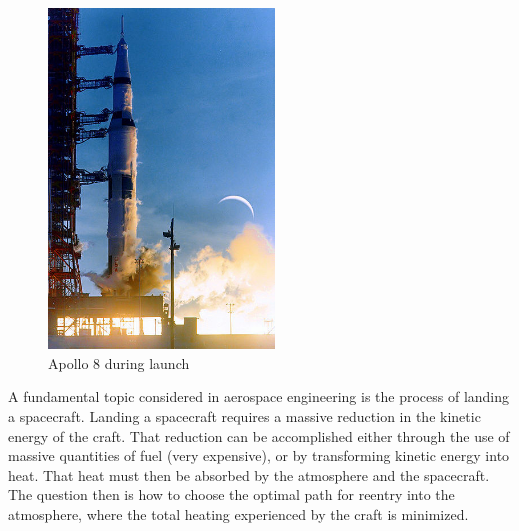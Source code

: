 \label{lab:reentry}

\begin{figure}
\centering
\includegraphics[width=6cm]{Apollo8_during_Launch.jpg}
\caption{Apollo 8 during launch}
\label{fig:reentry:apollo8}
\end{figure}

A fundamental topic considered in aerospace engineering is the process of landing a spacecraft. 
Landing a spacecraft requires a massive reduction in the kinetic energy of the craft. 
That reduction can be accomplished either through the use of massive quantities of fuel (very expensive), or by  transforming kinetic energy into heat. 
That heat must then be absorbed by the atmosphere and the spacecraft. 
The question then is how to choose the optimal path for reentry into the atmosphere, where the total heating experienced by the craft is minimized. 


